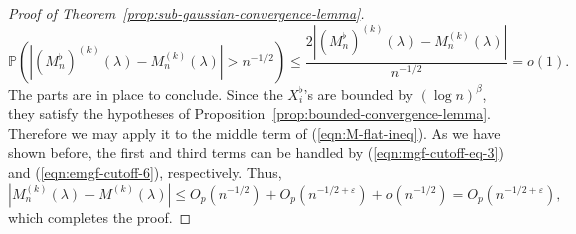 \documentclass{article}
\theoremstyle{definition}
\newcommand*\eps{\epsilon}
\renewcommand*\epsilon{\varepsilon}
\newcommand{\1}{\mathbbm{1}}
\renewcommand{\P}{\mathbb{P}}
\begin{document}
\begin{proof}[Proof of Theorem~\ref{prop:sub-gaussian-convergence-lemma}]
    \begin{equation}
        \P(|(M_n^\flat)^{(k)}(\lambda) - M_n^{(k)}(\lambda)| > n^{-1/2})  \leq \frac{2|(M_n^\flat)^{(k)}(\lambda) - M_n^{(k)}(\lambda)|}{n^{-1/2}} = o(1).
        \label{eqn:emgf-cutoff-6}
    \end{equation}
    The parts are in place to conclude. Since the $X^\flat_i$'s are bounded by $(\log n)^\beta$, they satisfy the hypotheses of Proposition~\ref{prop:bounded-convergence-lemma}. Therefore we may apply it to the middle term of (\ref{eqn:M-flat-ineq}). As we have shown before, the first and third terms can be handled by (\ref{eqn:mgf-cutoff-eq-3}) and (\ref{eqn:emgf-cutoff-6}), respectively. Thus, 
    \[
    |M_n^{(k)}(\lambda) - M^{(k)}(\lambda)| \leq O_p(n^{-1/2})+O_p(n^{-1/2 + \eps}) + o(n^{-1/2})=O_p(n^{-1/2 + \eps}),    \]
    which completes the proof.
\end{proof}
\end{document}
